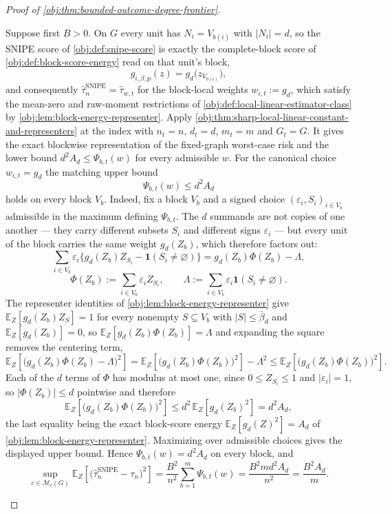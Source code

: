 \documentclass[11pt]{article}
\begin{document}
\begin{proof}[Proof of \cref{obj:thm:bounded-outcome-degree-frontier}]
\begin{enumerate}
Suppose first \(B>0\).  On \(G\) every unit has \(N_i=V_{b(i)}\) with
\(|N_i|=d\), so the SNIPE score of \cref{obj:def:snipe-score} is exactly the
complete-block score of \cref{obj:def:block-score-energy} read on that unit's
block,
\[
g_{i,\beta,p}(z)=g_d\bigl(z_{V_{b(i)}}\bigr),
\]
and consequently \(\widehat\tau_n^{\mathrm{SNIPE}}=\widehat\tau_{w,t}\) for the
block-local weights \(w_{i,t}:=g_d\), which satisfy the mean-zero and raw-moment
restrictions of \cref{obj:def:local-linear-estimator-class} by
\cref{obj:lem:block-energy-representer}.  Apply
\cref{obj:thm:sharp-local-linear-constant-and-representers} at the index with
\(n_t=n\), \(d_t=d\), \(m_t=m\) and \(G_t=G\).  It gives the exact blockwise
representation of the fixed-graph worst-case risk and the lower bound
\(d^2A_d\le\Psi_{b,t}(w)\) for every admissible \(w\).  For the canonical choice
\(w_{i,t}=g_d\) the matching upper bound
\[
\Psi_{b,t}(w)\le d^2A_d
\]
holds on every block \(V_b\).  Indeed, fix a block \(V_b\) and a signed choice
\((\varepsilon_i,S_i)_{i\in V_b}\) admissible in the maximum defining
\(\Psi_{b,t}\).  The \(d\) summands are not copies of one another — they carry
different subsets \(S_i\) and different signs \(\varepsilon_i\) — but every unit
of the block carries the same weight \(g_d(Z_b)\), which therefore factors out:
\[
\sum_{i\in V_b}\varepsilon_i\bigl\{g_d(Z_b)Z_{S_i}-\mathbf 1(S_i\ne\varnothing)\bigr\}
=
g_d(Z_b)\Phi(Z_b)-\Lambda,
\]
\[
\Phi(Z_b):=\sum_{i\in V_b}\varepsilon_iZ_{S_i},
\qquad
\Lambda:=\sum_{i\in V_b}\varepsilon_i\mathbf 1(S_i\ne\varnothing).
\]
The representer identities of \cref{obj:lem:block-energy-representer} give
\(\mathbb E_Z[g_d(Z_b)Z_S]=1\) for every nonempty \(S\subseteq V_b\) with
\(|S|\le\bar\beta_d\) and \(\mathbb E_Z[g_d(Z_b)]=0\), so
\(\mathbb E_Z[g_d(Z_b)\Phi(Z_b)]=\Lambda\) and expanding the square removes the
centering term,
\[
\mathbb E_Z\!\left[\bigl(g_d(Z_b)\Phi(Z_b)-\Lambda\bigr)^2\right]
=
\mathbb E_Z\!\left[\bigl(g_d(Z_b)\Phi(Z_b)\bigr)^2\right]-\Lambda^2
\le
\mathbb E_Z\!\left[\bigl(g_d(Z_b)\Phi(Z_b)\bigr)^2\right].
\]
Each of the \(d\) terms of \(\Phi\) has modulus at most one, since
\(0\le Z_{S_i}\le1\) and \(|\varepsilon_i|=1\), so \(|\Phi(Z_b)|\le d\)
pointwise and therefore
\[
\mathbb E_Z\!\left[\bigl(g_d(Z_b)\Phi(Z_b)\bigr)^2\right]
\le
d^2\,\mathbb E_Z\!\left[g_d(Z_b)^2\right]
=
d^2A_d ,
\]
the last equality being the exact block-score energy
\(\mathbb E_Z[g_d(Z)^2]=A_d\) of \cref{obj:lem:block-energy-representer}.
Maximizing over admissible choices gives the displayed upper bound.
Hence \(\Psi_{b,t}(w)=d^2A_d\) on every block, and
\[
\sup_{c\in\mathcal M_t(G)}
\mathbb E_Z\!\left[
\bigl(\widehat\tau_n^{\mathrm{SNIPE}}-\tau_n\bigr)^2
\right]
=
\frac{B^2}{n^2}\sum_{b=1}^{m}\Psi_{b,t}(w)
=
\frac{B^2md^2A_d}{n^2}
=
\frac{B^2A_d}{m}.
\]


\end{enumerate}
\end{proof}
\end{document}
